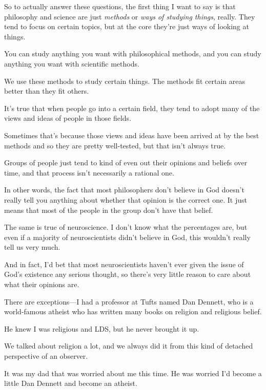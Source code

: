 \begin{compactitem}
			\item So to actually answer these questions, the first thing I want to say is that philosophy and science are just \textit{methods} or \textit{ways of studying things}, really. They tend to focus on certain topics, but at the core they're just ways of looking at things.
				\begin{compactitem}
					\item You can study anything you want with philosophical methods, and you can study anything you want with scientific methods.
					\item We use these methods to study certain things. The methods fit certain areas better than they fit others.
					\item It's true that when people go into a certain field, they tend to adopt many of the views and ideas of people in those fields.
					\item Sometimes that's because those views and ideas have been arrived at by the best methods and so they are pretty well-tested, but that isn't always true.
					\item Groups of people just tend to kind of even out their opinions and beliefs over time, and that process isn't necessarily a rational one.
					\item In other words, the fact that most philosophers don't believe in God doesn't really tell you anything about whether that opinion is the correct one. It just means that most of the people in the group don't have that belief.
					\item The same is true of neuroscience. I don't know what the percentages are, but even if a majority of neuroscientists didn't believe in God, this wouldn't really tell us very much.
					\item And in fact, I'd bet that most neuroscientists haven't ever given the issue of God's existence any serious thought, so there's very little reason to care about what their opinions are.
					\item There are exceptions---I had a professor at Tufts named Dan Dennett, who is a world-famous atheist who has written many books on religion and religious belief.
						\begin{compactitem}
							\item He knew I was religious and LDS, but he never brought it up.
							\item We talked about religion a lot, and we always did it from this kind of detached perspective of an observer.
							\item It was my dad that was worried about me this time. He was worried I'd become a little Dan Dennett and become an atheist.

\end{compactitem}
\end{compactitem}
\end{compactitem}
